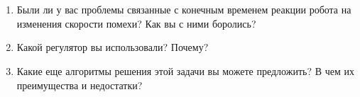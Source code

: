 {\hypertarget{lesson18x3}{}}\\\\

\begin{enumerate}	
	\item Были ли у вас проблемы связанные с конечным временем реакции робота на изменения скорости помехи? Как вы с ними боролись?
	\item  Какой регулятор вы использовали? Почему?
	\item  Какие еще алгоритмы решения этой задачи вы можете предложить? В чем их преимущества и недостатки?
\end{enumerate}